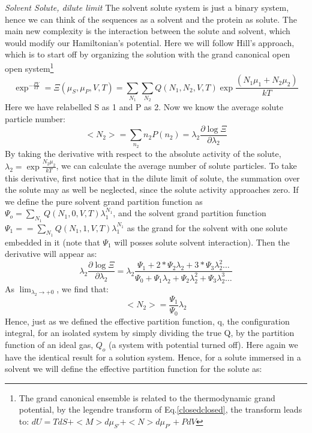   
  \emph{Solvent Solute, dilute limit}
  The solvent solute system is just a binary system, hence we can think of the sequences as a solvent and the protein as solute.  The main new complexity is the interaction between the solute and solvent, which would modify our Hamiltonian's potential. Here we will follow Hill's approach, which is to start off by organizing the solution with the grand canonical open open system\footnote{The grand canonical ensemble is related to the thermodynamic grand potential, by the legendre transform of Eq.\ref{closedclosed}, the transform leads to: $dU = TdS + <M> d\mu_{S'}  +<N> d\mu_{P'}  + PdV$}
  \begin{equation}\label{}
    \exp^{-\frac{PV}{kT} } = \Xi(\mu_S, \mu_P,V,T) = \sum_{N_1} \sum_{N_2} Q(N_1, N_2,V,T) \exp{\frac{(N_1 \mu_{1} + N_2 \mu_{2})}{kT}}
  \end{equation}
Here we have relabelled S as 1 and P as 2.  Now we know the average solute particle number:
\begin{equation}\label{}
  < N_2 > = \sum_{n_2}  n_2 P(n_2) = \lambda_{2}  \frac{\partial\log \Xi}{\partial \lambda_{2}}
\end{equation}
By taking the derivative with respect to the absolute activity of the solute, $\lambda_{2}=\exp{\frac{N_2\mu_{2}}{kT}}$, we can calculate the average number of solute particles.  To take this derivative, first notice that in the dilute limit of solute, the summation over the solute may as well be neglected, since the solute activity approaches zero.  If we define the pure solvent grand partition function as $\Psi_o=\sum_{N_1} Q(N_1,0,V,T)\lambda_1^{N_1}$, and the solvent grand partition function $\Psi_1==\sum_{N_1} Q(N_1,1,V,T)\lambda_1^{N_1}$ as the grand for the solvent with one solute embedded in it (note that $\Psi_1$ will posses solute solvent interaction).  Then the derivative will appear as:
\begin{equation}\label{}
  \lambda_{2}  \frac{\partial\log \Xi}{\partial \lambda_{2}} = \lambda_{2} \frac{\Psi_1 + 2* \Psi_2 \lambda_{2} +3*\Psi_3 \lambda_{2}^2 \dots  }{\Psi_0 + \Psi_1 \lambda_{2} +  \Psi_2 \lambda_{2}^2 +\Psi_3 \lambda_{2}^3 \dots }
\end{equation}
As $\lim_{\lambda_{2} \to +0}$, we find that:
\begin{equation}\label{}
  < N_2 > = \frac{ \Psi_1}{\Psi_0} \lambda_2
\end{equation}
Hence, just as we defined the effective partition function, q, the configuration integral, for an isolated system by simply dividing the true Q, by the partition function of an ideal gas, $Q_o$ (a system with potential turned off).  Here again we have the identical result for a solution system.  Hence, for a solute immersed in a solvent we will define the effective partition function for the solute as:
